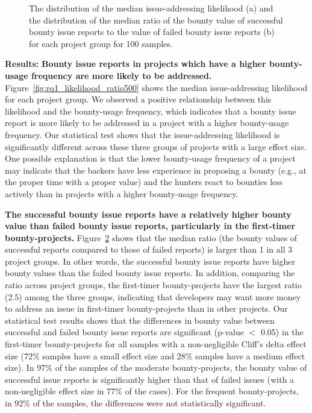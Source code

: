 \begin{figure}[t]
\begin{subfigure}[t]{0.45\columnwidth}
        \caption{}
          \label{fig:rq1_ratio_cp_ou500}
    \end{subfigure}
    \vspace{-0.1in}
    \caption{The distribution of the median issue-addressing likelihood (a) and the distribution of the median ratio of the bounty value of successful bounty issue reports to the value of failed bounty issue reports (b) for each project group for 100 samples.
    }
    \vspace{-0.2in}
\end{figure}


\noindent\textbf{Results:}
\textbf{Bounty issue reports in projects which have a higher bounty-usage frequency are more likely to be addressed.} Figure~\ref{fig:rq1_likelihood_ratio500} shows the median issue-addressing likelihood for each project group. We observed a positive relationship between this likelihood and the bounty-usage frequency, which indicates that a bounty issue report is more likely to be addressed in a project with a higher bounty-usage frequency. Our statistical test shows that the issue-addressing likelihood is significantly different across these three groups of projects with a large effect size. One possible explanation is that the lower bounty-usage frequency of a project may indicate that the backers have less experience in proposing a bounty (e.g., at the proper time with a proper value) and the hunters react to bounties less actively than in projects with a higher bounty-usage frequency.



\textbf{The successful bounty issue reports have a relatively higher bounty value than failed bounty issue reports, particularly in the first-timer bounty-projects.}
Figure~\ref{fig:rq1_ratio_cp_ou500} shows that the median ratio (the bounty values of successful reports compared to those of failed reports) is larger than 1 in all 3 project groups. In other words, the successful bounty issue reports have higher bounty values than the failed bounty issue reports. In addition, comparing the ratio across project groups, the first-timer bounty-projects have the largest ratio (2.5) among the three groups, indicating that developers may want more money to address an issue in first-timer bounty-projects than in other projects. Our statistical test results shows that the differences in bounty value between successful and failed bounty issue reports are significant (p-value $<$ 0.05) in the first-timer bounty-projects for all samples with a non-negligible Cliff's delta effect size (72\% samples have a small effect size and 28\% samples have a medium effect size).
In 97\% of the samples of the moderate bounty-projects, the bounty value of successful issue reports is significantly higher than that of failed issues (with a non-negligible effect size in 77\% of the cases).
For the frequent bounty-projects, in 92\% of the samples, the differences were not statistically significant.



